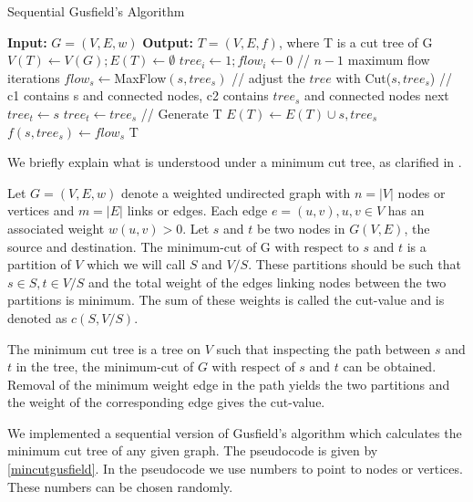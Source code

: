 \begin{algorithm}
\caption{Sequential Gusfield's Algorithm}
\label{mincutgusfield}
\begin{algorithmic}
\STATE \textbf{Input:} $G = (V,E,w)$ 
\STATE \textbf{Output:} $T = (V,E,f)$, where T is a cut tree of G
\STATE $V(T) \leftarrow V(G); E(T) \leftarrow \emptyset$
\STATE $tree_i \leftarrow 1; flow_i \leftarrow 0$
\ENDFOR
\STATE // $n - 1$ maximum flow iterations
\STATE $flow_s \leftarrow $MaxFlow$(s, tree_s)$
\STATE // adjust the $tree$ with Cut($s,tree_s$)
\STATE // c1 contains s and connected nodes, c2 contains $tree_s$ and connected nodes
			\STATE next
			\STATE $tree_t \leftarrow s$
			\STATE $tree_t \leftarrow tree_s$
		\ENDIF
	\ENDFOR
\ENDFOR
\STATE // Generate T
\STATE $E(T) \leftarrow E(T) \cup {s, tree_s}$
\STATE $f({s,tree_s}) \leftarrow flow_s$
\ENDFOR
\RETURN T
\end{algorithmic}
\end{algorithm}


We briefly explain what is understood under a minimum cut tree, as clarified in \cite{saha2006dynamic}. 

Let $G = (V,E,w)$ denote a weighted undirected graph with $n = |V|$ nodes or vertices and $m = |E|$ links or edges. Each edge $e = (u, v), u,v \in V$ has an associated weight $w(u,v) > 0$. Let $s$ and $t$ be two nodes in $G(V,E)$, the source and destination. The minimum-cut of G with respect to $s$ and $t$ is a partition of $V$ which we will call $S$ and $V/S$. These partitions should be such that $s \in S, t \in V/S$ and the total weight of the edges linking nodes between the two partitions is minimum. The sum of these weights is called the cut-value and is denoted as $c(S,V/S)$. 

The minimum cut tree is a tree on $V$ such that inspecting the path between $s$ and $t$ in the tree, the minimum-cut of $G$ with respect of $s$ and $t$ can be obtained. Removal of the minimum weight edge in the path yields the two partitions and the weight of the corresponding edge gives the cut-value.

We implemented a sequential version of Gusfield's algorithm which calculates the minimum cut tree of any given graph. The pseudocode is given by \autoref{mincutgusfield}. In the pseudocode we use numbers to point to nodes or vertices. These numbers can be chosen randomly.


